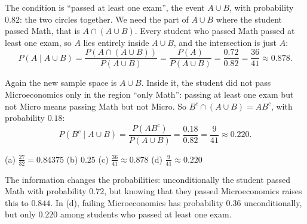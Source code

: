 \begin{solution}
	 The condition is ``passed at least one exam'', the event
	$A\cup B$, with probability $0.82$: the two circles together. We need the
	part of $A\cup B$ where the student passed Math, that is
	$A\cap(A\cup B)$. Every student who passed Math passed at least one exam,
	so $A$ lies entirely inside $A\cup B$, and the intersection is just $A$:
	\[ P(A\mid A\cup B)=\frac{P(A\cap(A\cup B))}{P(A\cup B)}
		=\frac{P(A)}{P(A\cup B)}=\frac{0.72}{0.82}=\frac{36}{41}\approx 0.878. \]

	 Again the new sample space is $A\cup B$. Inside it, the student
	did not pass Microeconomics only in the region ``only Math'': passing at
	least one exam but not Micro means passing Math but not Micro. So
	$B^c\cap(A\cup B)=AB^c$, with probability $0.18$:
	\[ P(B^c\mid A\cup B)=\frac{P(AB^c)}{P(A\cup B)}=\frac{0.18}{0.82}
		=\frac{9}{41}\approx 0.220. \]
	\begin{answer}
		(a) $\frac{27}{32}=0.84375$ \quad (b) $0.25$ \quad
		(c) $\frac{36}{41}\approx 0.878$ \quad (d) $\frac{9}{41}\approx 0.220$
	\end{answer}
	\begin{remark}
		The information changes the probabilities: unconditionally the student
		passed Math with probability $0.72$, but knowing that they passed
		Microeconomics raises this to $0.844$. In (d), failing Microeconomics has
		probability $0.36$ unconditionally, but only $0.220$ among students who
		passed at least one exam.
	\end{remark}
\end{solution}
